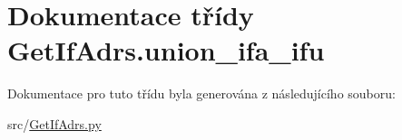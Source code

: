 \hypertarget{classGetIfAdrs_1_1union__ifa__ifu}{\section{Dokumentace třídy Get\-If\-Adrs.\-union\-\_\-ifa\-\_\-ifu}
\label{d6/d8e/classGetIfAdrs_1_1union__ifa__ifu}
}


Dokumentace pro tuto třídu byla generována z následujícího souboru\-:\begin{DoxyCompactItemize}
\item 
src/\hyperlink{GetIfAdrs_8py}{Get\-If\-Adrs.\-py}\end{DoxyCompactItemize}
